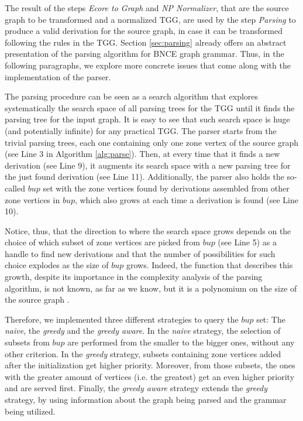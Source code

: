 
The result of the steps \textit{Ecore to Graph} and \textit{NP Normalizer}, that are the source graph to be transformed and a normalized TGG, are used by the step \textit{Parsing} to produce a valid derivation for the source graph, in case it can be transformed following the rules in the TGG. Section \ref{sec:parsing} already offers an abstract presentation of the parsing algorithm for BNCE graph grammar. Thus, in the following paragraphs, we explore more concrete issues that come along with the implementation of the parser.

The parsing procedure can be seen as a search algorithm that explores systematically the search space of all parsing trees for the TGG until it finds the parsing tree for the input graph. It is easy to see that such search space is huge (and potentially infinite) for any practical TGG. The parser starts from the trivial parsing trees, each one containing only one zone vertex of the source graph (see Line 3 in Algorithm \ref{alg:parse}). Then, at every time that it finds a new derivation (see Line 9), it augments its search space with a new parsing tree for the just found derivation (see Line 11). Additionally, the parser also holds the so-called $bup$ set with the zone vertices found by derivations assembled from other zone vertices in $bup$, which also grows at each time a derivation is found (see Line 10).

Notice, thus, that the direction to where the search space grows depends on the choice of which subset of zone vertices are picked from $bup$ (see Line 5) as a handle to find new derivations and that the number of possibilities for such choice explodes as the size of $bup$ grows. Indeed, the function that describes this growth, despite its importance in the complexity analysis of the parsing algorithm, is not known, as far as we know, but it is a polynomium on the size of the source graph \cite[p. 160]{rozenberg1986boundary}.


Therefore, we implemented three different strategies to query the $bup$ set: The \textit{naive}, the \textit{greedy} and the \textit{greedy aware}. In the \textit{naive} strategy, the selection of subsets from $bup$ are performed from the smaller to the bigger ones, without any other criterion. In the \textit{greedy} strategy, subsets containing zone vertices added after the initialization get higher priority. Moreover, from those subsets, the ones with the greater amount of vertices (i.e. the greatest) get an even higher priority and are served first. Finally, the \textit{greedy aware} strategy extends the \textit{greedy} strategy, by using information about the graph being parsed and the grammar being utilized.

